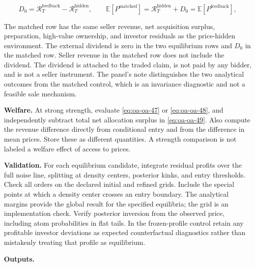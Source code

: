 \documentclass[
  11pt,
]{article}
\begin{document}
\[
D_0=\mathcal R_T^{\mathrm{feedback}}-\mathcal R_T^{\mathrm{hidden}},\qquad
\mathbb E[P^{\mathrm{matched}}]=\mathcal R_T^{\mathrm{hidden}}+D_0=\mathbb E[P^{\mathrm{feedback}}],
\]

The matched row has the same seller revenue, net acquisition surplus,
preparation, high-value ownership, and investor residuals as the
price-hidden environment. The external dividend is zero in the two
equilibrium rows and \(D_0\) in the matched row. Seller revenue in the
matched row does not include the dividend. The dividend is attached to
the traded claim, is not paid by any bidder, and is not a seller
instrument. The panel's note distinguishes the two analytical outcomes
from the matched control, which is an invariance diagnostic and not a
feasible sale mechanism.



\textbf{Welfare.} At strong strength, evaluate \eqref{eq:oa-oa-47} or
\eqref{eq:oa-oa-48}, and independently subtract total net allocation
surplus in \eqref{eq:oa-oa-49}. Also compute the revenue difference
directly from conditional entry and from the difference in mean prices.
Store these as different quantities. A strength comparison is not
labeled a welfare effect of access to prices.

\textbf{Validation.} For each equilibrium candidate, integrate residual
profits over the full noise line, splitting at density centers,
posterior kinks, and entry thresholds. Check all orders on the declared
initial and refined grids. Include the special points at which a density
center crosses an entry boundary. The analytical margins provide the
global result for the specified equilibria; the grid is an
implementation check. Verify posterior inversion from the observed
price, including atom probabilities in flat tails. In the frozen-profile
control retain any profitable investor deviations as expected
counterfactual diagnostics rather than mistakenly treating that profile
as equilibrium.

\textbf{Outputs.}
\end{document}
